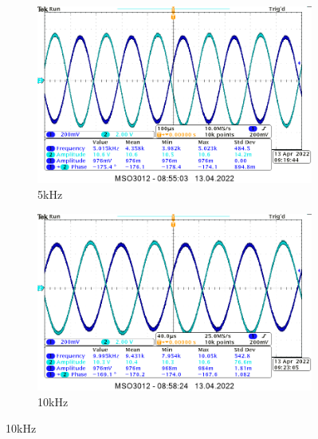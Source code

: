 \begin{itemize}
{        \begin{figure}[H]
            \centering    
            \begin{subfigure}[h]{0.4\textwidth}
                \includegraphics[width=\textwidth]{img/osciloscope/charakterystyka/1_5khz_cropped.png}
                \caption*{5kHz}
            \end{subfigure}
            \begin{subfigure}[h]{0.4\textwidth}
                \includegraphics[width=\textwidth]{img/osciloscope/charakterystyka/1_10khz_cropped.png}
                \caption*{10kHz}
            \end{subfigure}
        \end{figure}
        
}
\end{itemize}
